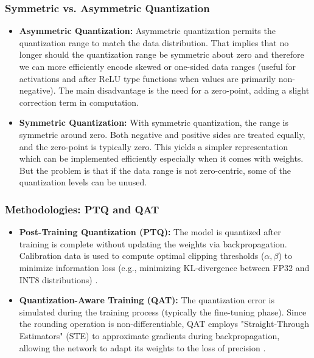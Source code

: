 \subsubsection{Symmetric vs. Asymmetric Quantization}
\begin{itemize}
    \item \textbf{Asymmetric Quantization:}
Asymmetric quantization permits the quantization range to match the data distribution. That implies that no longer should the quantization range be symmetric about zero and therefore we can more efficiently encode skewed or one-sided data ranges (useful for activations and after ReLU type functions when values are primarily non-negative). The main disadvantage is the need for a zero-point, adding a slight correction term in computation.

    \item \textbf{Symmetric Quantization:}
With symmetric quantization, the range is symmetric around zero. Both negative and positive sides are treated equally, and the zero-point is typically zero. This yields a simpler representation which can be implemented efficiently especially when it comes with weights. But the problem is that if the data range is not zero-centric, some of the quantization levels can be unused.
\end{itemize}

\subsubsection{Methodologies: PTQ and QAT}
\begin{itemize}
    \item \textbf{Post-Training Quantization (PTQ):} The model is quantized after training is complete without updating the weights via backpropagation. Calibration data is used to compute optimal clipping thresholds ($\alpha, \beta$) to minimize information loss (e.g., minimizing KL-divergence between FP32 and INT8 distributions) \cite{liu-etal-2023-llm}.
    \item \textbf{Quantization-Aware Training (QAT):} The quantization error is simulated during the training process (typically the fine-tuning phase). Since the rounding operation is non-differentiable, QAT employs "Straight-Through Estimators" (STE) to approximate gradients during backpropagation, allowing the network to adapt its weights to the loss of precision \cite{jacob2018quantization}.
\end{itemize}

